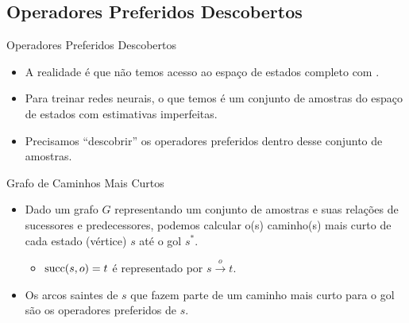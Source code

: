 \documentclass{beamer}
\begin{document}
\subsection{Operadores Preferidos Descobertos}
\begin{frame}{Operadores Preferidos Descobertos}
\begin{itemize}
  \item A realidade é que \alert{não temos acesso ao espaço de estados completo} com \hstar.
  \pause
  \item Para treinar redes neurais, o que temos é um \alert{conjunto de amostras} do espaço de estados com \alert{estimativas imperfeitas}.
  \pause
  \item Precisamos ``descobrir'' os operadores preferidos dentro desse conjunto de amostras.
\end{itemize}
\end{frame}

\begin{frame}{Grafo de Caminhos Mais Curtos}
\begin{itemize}
  \item Dado um grafo $G$ representando um \alert{conjunto de amostras} e suas relações de sucessores e predecessores, podemos calcular o(s) \alert{caminho(s) mais curto de cada estado} (vértice) $s$ até o gol $s^{*}$.
  \begin{itemize}
    \item $\operatorname{succ}(s, o) = t$ é representado por $s \xrightarrow{o} t$.
  \end{itemize}
  \pause
  \item Os \alert{arcos saintes} de $s$ que \alert{fazem parte de um caminho mais curto} para o gol são os \alert{operadores preferidos} de $s$.
\end{itemize}
\end{frame}
\end{document}
